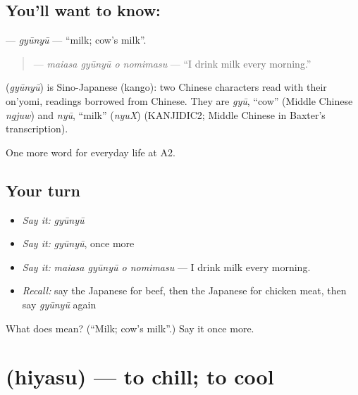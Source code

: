 \subsection*{You'll want to know: }
\textbf{} — \emph{gyūnyū} — \textquotedblleft{}milk; cow's milk\textquotedblright{}.

\begin{quote}
\textbf{  } — \emph{maiasa gyūnyū o nomimasu} — \textquotedblleft{}I drink milk every morning.\textquotedblright{}
\end{quote}

\begin{cousinweb}
\textbf{} (\emph{gyūnyū}) is Sino-Japanese (kango): two Chinese characters read with their on'yomi, readings borrowed from Chinese. They are \emph{gyū}, \textquotedblleft{}cow\textquotedblright{} (Middle Chinese \emph{ngjuw}) and \emph{nyū}, \textquotedblleft{}milk\textquotedblright{} (\emph{nyuX}) (KANJIDIC2; Middle Chinese in Baxter's transcription).
\end{cousinweb}

\begin{grammarlens}[title={What you've built}]
One more word for everyday life at A2.
\end{grammarlens}

\subsection*{Your turn}
\begin{itemize}
\raggedright
  \item \emph{Say it:} \emph{gyūnyū}
  \item \emph{Say it:} \emph{gyūnyū}, once more
  \item \emph{Say it:} \emph{maiasa gyūnyū o nomimasu} — I drink milk every morning.
  \item \emph{Recall:} say the Japanese for beef, then the Japanese for chicken meat, then say \emph{gyūnyū} again
\end{itemize}

\begin{tcolorbox}[breakable,colback=teal!4,colframe=teal!35!black,title={Before you move on}]
What does  mean? (\textquotedblleft{}Milk; cow's milk\textquotedblright{}.) Say it once more.
\end{tcolorbox}
\section[\texorpdfstring{\ja{ひやす} (hiyasu)}{ひやす (hiyasu)}]{ (hiyasu) — to chill; to cool}

